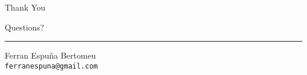 \documentclass[aspectratio=169]{beamer}
\theoremstyle{mystyle}
\begin{document}
\begin{frame}[plain] %
    \vfill %
    \centering
    \begin{Huge}
        Thank You
    \end{Huge}

    \vspace{0.5cm}


    \vfill

    \Huge
    Questions?

    \vfill
    \vfill

    \rule{\textwidth}{0.4pt} %
    \vspace{0.2cm}
    \normalsize
    Ferran Espuña Bertomeu \\
    \texttt{ferranespuna@gmail.com} %
\end{frame}
\end{document}
